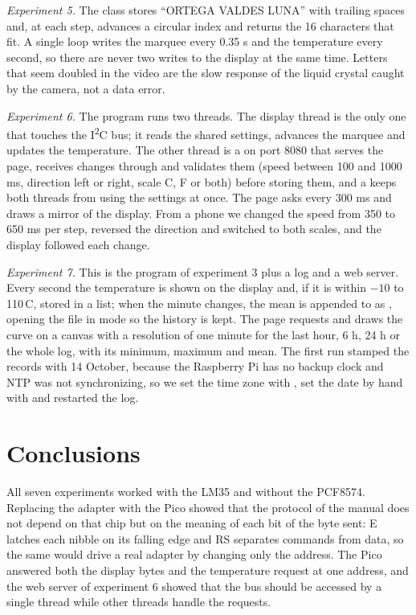 \documentclass[12pt,letterpaper]{article}
\begin{document}
\emph{Experiment 5.} The class  stores ``ORTEGA VALDES LUNA'' with trailing spaces and, at each step, advances a circular index and returns the 16 characters that fit. A single loop writes the marquee every 0.35 s and the temperature every second, so there are never two writes to the display at the same time. Letters that seem doubled in the video are the slow response of the liquid crystal caught by the camera, not a data error.

\emph{Experiment 6.} The program runs two threads. The display thread is the only one that touches the I\textsuperscript{2}C bus; it reads the shared settings, advances the marquee and updates the temperature. The other thread is a  on port 8080 that serves the page, receives changes through  and validates them (speed between 100 and 1000 ms, direction left or right, scale C, F or both) before storing them, and a  keeps both threads from using the settings at once. The page asks  every 300 ms and draws a mirror of the display. From a phone we changed the speed from 350 to 650 ms per step, reversed the direction and switched to both scales, and the display followed each change.

\emph{Experiment 7.} This is the program of experiment 3 plus a log and a web server. Every second the temperature is shown on the display and, if it is within $-10$ to 110\,\textdegree C, stored in a list; when the minute changes, the mean is appended to  as , opening the file in mode  so the history is kept. The page requests  and draws the curve on a canvas with a resolution of one minute for the last hour, 6 h, 24 h or the whole log, with its minimum, maximum and mean. The first run stamped the records with 14 October, because the Raspberry Pi has no backup clock and NTP was not synchronizing, so we set the time zone with , set the date by hand with  and restarted the log.

\section{Conclusions}
All seven experiments worked with the LM35 and without the PCF8574. Replacing the adapter with the Pico showed that the protocol of the manual does not depend on that chip but on the meaning of each bit of the byte sent: E latches each nibble on its falling edge and RS separates commands from data, so the same  would drive a real adapter by changing only the address. The Pico answered both the display bytes and the temperature request at one address, and the web server of experiment 6 showed that the bus should be accessed by a single thread while other threads handle the requests.
\end{document}
